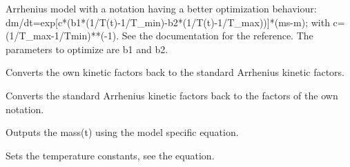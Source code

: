 \documentclass[letterpaper,10pt,english]{sphinxmanual}
\begin{document}
\begin{fulllineitems}
\label{FittingClasses:Models.ArrheniusModelAlternativeNotation2}
Arrhenius model with a notation having a better optimization behaviour: dm/dt=exp{[}c*(b1*(1/T(t)-1/T\_min)-b2*(1/T(t)-1/T\_max)){]}*(ms-m); with c=(1/T\_max-1/Tmin)**(-1). See the documentation for the reference. The parameters to optimize are b1 and b2.

\begin{fulllineitems}
\label{FittingClasses:Models.ArrheniusModelAlternativeNotation2.ConvertKinFactors}
Converts the own kinetic factors back to the standard Arrhenius kinetic factors.

\end{fulllineitems}


\begin{fulllineitems}
\label{FittingClasses:Models.ArrheniusModelAlternativeNotation2.ConvertKinFactorsToOwnNotation}
Converts the standard Arrhenius kinetic factors back to the factors of the own notation.

\end{fulllineitems}


\begin{fulllineitems}
\label{FittingClasses:Models.ArrheniusModelAlternativeNotation2.calcMass}
Outputs the mass(t) using the model specific equation.

\end{fulllineitems}


\begin{fulllineitems}
\label{FittingClasses:Models.ArrheniusModelAlternativeNotation2.setMinMaxTemp}
Sets the temperature constants, see the equation.

\end{fulllineitems}


\end{fulllineitems}
\end{document}
